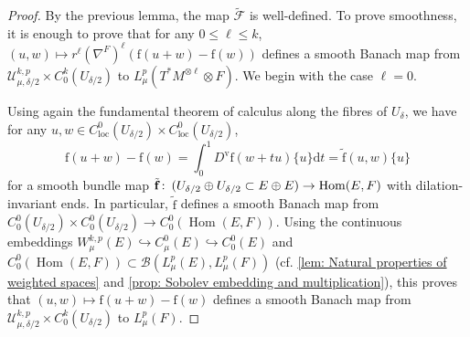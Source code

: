 \documentclass{article}
\numberwithin{equation}{section}        %
\theoremstyle{bfnote}
\theoremstyle{definition}
\theoremstyle{bfremark}
\newcommand{\col}{\colon \thinspace}        %
\newcommand{\diff}{\mathrm{d}}                      %
\newcommand{\bmap}[1]{\boldsymbol{\mathrm{#1}}}     %
\DeclareMathOperator{\Hom}{Hom}                 %
\begin{document}
\begin{proof}
    By the previous lemma, the map $\tilde{\mathcal{F}}$ is well-defined. To prove smoothness, it is enough to prove that for any $0 \leq \ell \leq k$, $(u,w) \mapsto r^\ell(\nabla^F)^\ell (\bmap{f}(u+w)-\bmap{f}(w))$ defines a smooth Banach map from $\mathcal{U}^{k,p}_{\mu,\delta/2} \times C^{k}_0(U_{\delta/2})$ to $L^p_\mu(T^*M^{\otimes \ell} \otimes F)$. We begin with the case $\ell = 0$.
     
     Using again the fundamental theorem of calculus along the fibres of $U_\delta$, we have for any $u, w \in C^0_{\mathrm{loc}}(U_{\delta/2} )\times C^0_{\mathrm{loc}}(U_{\delta/2})$,
    \begin{equation*}
        \bmap{f}(u+w)-\bmap{f}(w) = \int_0^1 D^{\mathrm{v}} \bmap{f}(w+tu) \{u\} \diff t = \tilde{\bmap{f}}(u,w)\{u\}
    \end{equation*}
    for a smooth bundle map $\tilde{\bmap{f}} \col (U_{\delta/2} \oplus U_{\delta/2} \subset E \oplus E) \to \Hom(E,F)$ with  dilation-invariant ends. In particular, $\tilde{\bmap{f}}$ defines a smooth Banach map from $C^0_0(U_{\delta/2}) \times C^0_0(U_{\delta/2}) \to C^0_0(\Hom(E,F))$. Using the continuous embeddings $W^{k,p}_\mu(E) \hookrightarrow C^0_\mu(E) \hookrightarrow C^0_0(E)$ and $C^0_0(\Hom(E,F)) \subset \mathcal{B}(L^p_\mu(E),L^p_\mu(F))$ (cf. \cref{lem: Natural properties of weighted spaces} and \cref{prop: Sobolev embedding and multiplication}), this proves that $(u,w) \mapsto \bmap{f}(u+w)-\bmap{f}(w)$ defines a smooth Banach map from $\mathcal{U}^{k,p}_{\mu,\delta/2} \times C^{k}_0(U_{\delta/2})$ to $L^p_\mu(F)$.
    

\end{proof}
\end{document}
